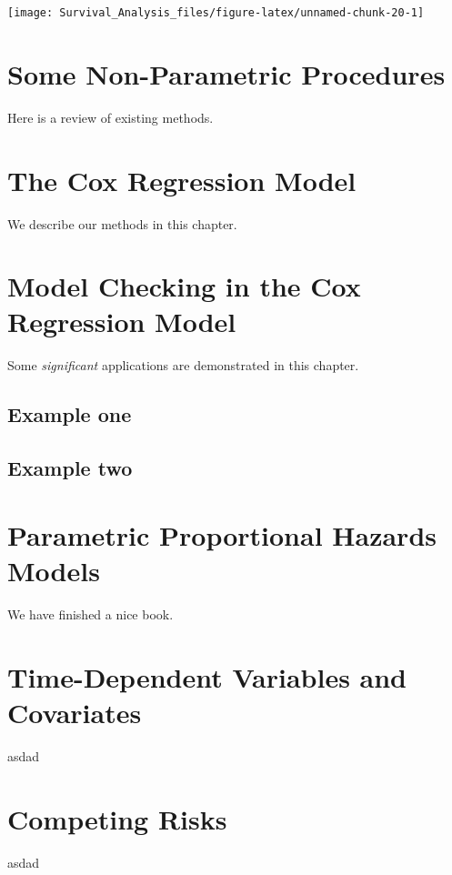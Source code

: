 \documentclass[
]{book}
\begin{document}
\texttt{[image: Survival\_Analysis\_files/figure-latex/unnamed-chunk-20-1]}

\hypertarget{some-non-parametric-procedures}{%
\chapter{Some Non-Parametric Procedures}\label{some-non-parametric-procedures}}

Here is a review of existing methods.

\hypertarget{the-cox-regression-model}{%
\chapter{The Cox Regression Model}\label{the-cox-regression-model}}

We describe our methods in this chapter.

\hypertarget{model-checking-in-the-cox-regression-model}{%
\chapter{Model Checking in the Cox Regression Model}\label{model-checking-in-the-cox-regression-model}}

Some \emph{significant} applications are demonstrated in this chapter.

\hypertarget{example-one}{%
\section{Example one}\label{example-one}}

\hypertarget{example-two}{%
\section{Example two}\label{example-two}}

\hypertarget{parametric-proportional-hazards-models}{%
\chapter{Parametric Proportional Hazards Models}\label{parametric-proportional-hazards-models}}

We have finished a nice book.

\hypertarget{time-dependent-variables-and-covariates}{%
\chapter{Time-Dependent Variables and Covariates}\label{time-dependent-variables-and-covariates}}

asdad

\hypertarget{competing-risks}{%
\chapter{Competing Risks}\label{competing-risks}}

asdad

  
\end{document}
